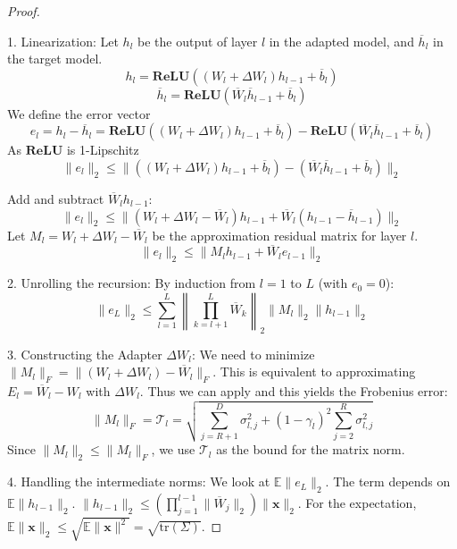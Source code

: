 \documentclass{article}
\begin{document}
                \begin{proof}$~$

                    1.  Linearization:
                        Let $h_l$ be the output of layer $l$ in the adapted model, and $\overline{h}_l$ in the target model.
                        $$ h_l = \mathbf{ReLU}((W_l + \Delta W_l) h_{l-1} + \overline{b}_l) $$
                        $$ \overline{h}_l = \mathbf{ReLU}(\overline{W}_l \overline{h}_{l-1} + \overline{b}_l) $$
                        We define the error vector 
                        $$e_l = h_l - \overline{h}_l = \mathbf{ReLU}((W_l + \Delta W_l) h_{l-1}+ \overline{b}_l) - \mathbf{ReLU}(\overline{W}_l \overline{h}_{l-1} + \overline{b}_l) $$
                        As $\mathbf{ReLU}$ is 1-Lipschitz
                        $$\|e_l\|_2 \leqslant \| ((W_l + \Delta W_l) h_{l-1}+ \overline{b}_l) - (\overline{W}_l \overline{h}_{l-1} + \overline{b}_l)\|_2 $$

                        Add and subtract $\overline{W}_l h_{l-1}$:
                        $$ \|e_l\|_2 \leqslant \|(W_l + \Delta W_l - \overline{W}_l) h_{l-1} + \overline{W}_l (h_{l-1} - \overline{h}_{l-1})\|_2 $$
                        Let $M_l = W_l + \Delta W_l - \overline{W}_l$ be the approximation residual matrix for layer $l$.
                        $$ \|e_l\|_2 \leqslant \|M_l h_{l-1} + \overline{W}_l e_{l-1}\|_2 $$
                        


                    2.  Unrolling the recursion:
                        By induction from $l=1$ to $L$ (with $e_0 = 0$):
                        $$ \|e_L\|_2 \leqslant \sum_{l=1}^L \left\| \prod_{k=l+1}^L \overline{W}_k \right\|_2 \| M_l \|_2 \| h_{l-1} \|_2 $$

                    3.  Constructing the Adapter $\Delta W_l$:
                        We need to minimize $\| M_l \|_F = \| (W_l + \Delta W_l) - \overline{W}_l \|_F$.
                        This is equivalent to approximating $E_l = \overline{W}_l - W_l$ with $\Delta W_l$.
                        Thus we can apply \label{lemma:lemma2} and this yields the Frobenius error:
                        $$ \| M_l \|_F = \mathcal{T}_l = \sqrt{ \sum_{j=R+1}^D \sigma_{l,j}^2 + (1 - \gamma_l)^2 \sum_{j=2}^R \sigma_{l,j}^2 } $$
                        Since $\|M_l\|_2 \leqslant \|M_l\|_F$, we use $\mathcal{T}_l$ as the bound for the matrix norm.


                    4.  Handling the intermediate norms:
                        We look at $\mathbb{E} \|e_L\|_2$.
                        The term depends on $\mathbb{E} \|h_{l-1}\|_2$. $\|h_{l-1}\|_2 \leqslant (\prod_{j=1}^{l-1} \|\overline{W}_j\|_2) \|\mathbf{x}\|_2$.
                        For the expectation, $\mathbb{E}\|\mathbf{x}\|_2 \leqslant \sqrt{\mathbb{E}\|\mathbf{x}\|^2} = \sqrt{\text{tr}(\Sigma)}$.
                        


\end{proof}
\end{document}

